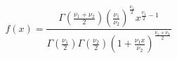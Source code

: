 

\[
f(x) = \frac{\Gamma(\frac{\nu_{1} + \nu_{2}} {2}) (\frac{\nu_{1}} {\nu_{2}})^{\frac{\nu_{1}} {2}} x^{\frac{\nu_{1}} {2} - 1 }} {\Gamma(\frac{\nu_{1}} {2}) \Gamma(\frac{\nu_{2}} {2}) (1 + \frac{\nu_{1}x} {\nu_{2}})^{\frac{\nu_{1} + \nu_{2}} {2}}  }
\]



